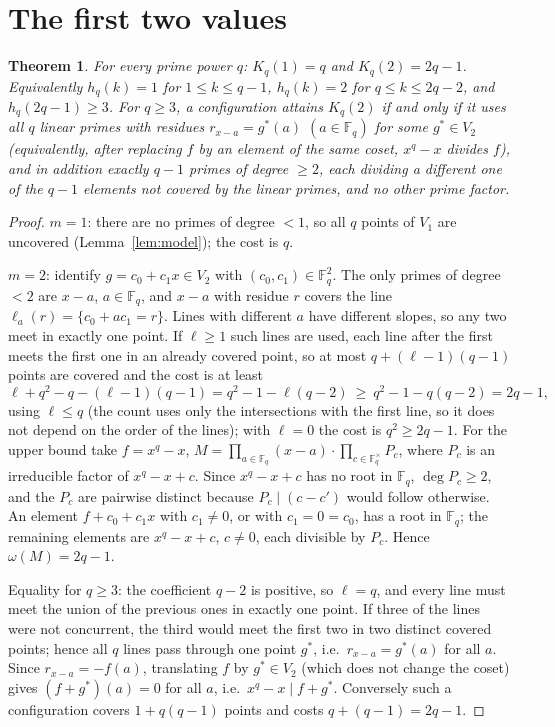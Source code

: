 \documentclass[11pt]{amsart}
\newtheorem{theorem}{Theorem}[section]
\theoremstyle{remark}
\newcommand{\F}{\mathbb F}
\begin{document}
\section{The first two values}
\begin{theorem}\label{thm:main}
For every prime power $q$: $K_q(1)=q$ and $K_q(2)=2q-1$. Equivalently $h_q(k)=1$ for $1\le k\le q-1$,
$h_q(k)=2$ for $q\le k\le 2q-2$, and $h_q(2q-1)\ge3$. For $q\ge3$, a configuration attains
$K_q(2)$ if and only if it uses all $q$ linear primes with residues $r_{x-a}=g^*(a)$
$(a\in\F_q)$ for some $g^*\in V_2$ (equivalently, after replacing $f$ by an element of the same
coset, $x^q-x$ divides $f$), and in addition exactly $q-1$ primes of degree $\ge2$, each dividing a
different one of the $q-1$ elements not covered by the linear primes, and no other prime factor.
\end{theorem}
\begin{proof}
$m=1$: there are no primes of degree $<1$, so all $q$ points of $V_1$ are uncovered
(Lemma~\ref{lem:model}); the cost is $q$.

$m=2$: identify $g=c_0+c_1x\in V_2$ with $(c_0,c_1)\in\F_q^2$. The only primes of degree $<2$ are
$x-a$, $a\in\F_q$, and $x-a$ with residue $r$ covers the line $\ell_a(r)=\{c_0+ac_1=r\}$. Lines with
different $a$ have different slopes, so any two meet in exactly one point. If $\ell\ge1$ such lines
are used, each line after the first meets the first one in an already covered point, so at most
$q+(\ell-1)(q-1)$ points are covered and the cost is at least
\[
 \ell+q^2-q-(\ell-1)(q-1)=q^2-1-\ell(q-2)\ \ge\ q^2-1-q(q-2)=2q-1,
\]
using $\ell\le q$ (the count uses only the intersections with the first line, so it does not
depend on the order of the lines); with $\ell=0$ the cost is $q^2\ge2q-1$. For the upper bound take
$f=x^q-x$, $M=\prod_{a\in\F_q}(x-a)\cdot\prod_{c\in\F_q^\times}P_c$, where $P_c$ is an irreducible
factor of $x^q-x+c$. Since $x^q-x+c$ has no root in $\F_q$, $\deg P_c\ge2$, and the $P_c$ are
pairwise distinct because $P_c\mid (c-c')$ would follow otherwise. An element $f+c_0+c_1x$ with
$c_1\ne0$, or with $c_1=0=c_0$, has a root in $\F_q$; the remaining elements are $x^q-x+c$,
$c\ne0$, each divisible by $P_c$. Hence $\omega(M)=2q-1$.

Equality for $q\ge3$: the coefficient $q-2$ is positive, so $\ell=q$, and every line must meet the
union of the previous ones in exactly one point. If three of the lines were not concurrent, the
third would meet the first two in two distinct covered points; hence all $q$ lines pass through one
point $g^*$, i.e.\ $r_{x-a}=g^*(a)$ for all $a$. Since $r_{x-a}=-f(a)$, translating $f$ by $g^*\in V_2$ (which does not
change the coset) gives $(f+g^*)(a)=0$ for all $a$, i.e.\ $x^q-x\mid f+g^*$. Conversely such a
configuration covers $1+q(q-1)$ points and costs $q+(q-1)=2q-1$.
\end{proof}
\end{document}
